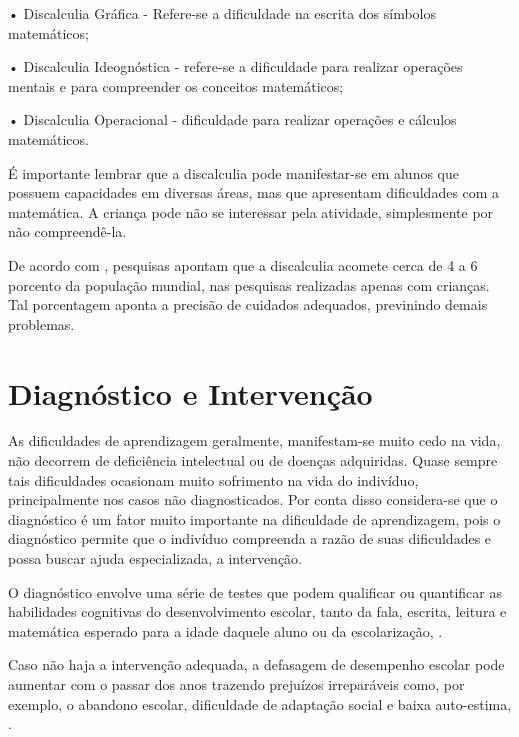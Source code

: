 \documentclass[
	12pt,				%
    oneside,			%
	a4paper,			%
	english,			%
	french,				%
	spanish,			%
	brazil,				%
	]{abntex2}
\begin{document}
•	Discalculia Gráfica - Refere-se a dificuldade na escrita dos símbolos matemáticos;

•	Discalculia Ideognóstica - refere-se a dificuldade para realizar operações mentais e para compreender os conceitos matemáticos;

•	Discalculia Operacional - dificuldade para realizar operações e cálculos matemáticos.

É importante lembrar que a discalculia pode manifestar-se em alunos que possuem capacidades em diversas áreas, mas que apresentam dificuldades com a matemática. A criança pode não se interessar pela atividade, simplesmente por não compreendê-la.

De acordo com \cite{Villar}, pesquisas apontam que a discalculia acomete cerca de 4 a 6 porcento da população mundial, nas pesquisas realizadas apenas com crianças. Tal porcentagem aponta a precisão de cuidados adequados, previnindo demais problemas.

\section{Diagnóstico e Intervenção}

As dificuldades de aprendizagem geralmente, manifestam-se muito cedo na vida, não decorrem de deficiência intelectual ou de doenças adquiridas. Quase sempre tais dificuldades ocasionam muito sofrimento na vida do indivíduo, principalmente nos casos não diagnosticados. Por conta disso considera-se que o diagnóstico é um fator muito importante na dificuldade de aprendizagem, pois o diagnóstico permite que o indivíduo compreenda a razão de suas dificuldades e possa buscar ajuda especializada, a intervenção.

O diagnóstico envolve uma série de testes que podem qualificar ou quantificar as habilidades cognitivas do desenvolvimento escolar, tanto da fala, escrita, leitura e matemática esperado para a idade daquele aluno ou da escolarização, \cite{Villar}.



Caso não haja a intervenção adequada, a defasagem de desempenho escolar pode aumentar com o passar dos anos trazendo prejuízos irreparáveis como, por exemplo, o abandono escolar, dificuldade de adaptação social e baixa auto-estima, \cite{Villar}.
\end{document}

